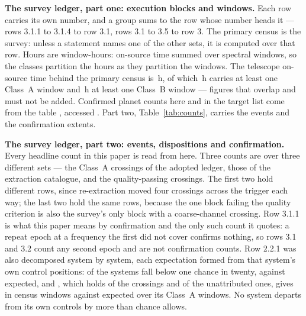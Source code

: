 \begin{table}
\centering
\scriptsize
\caption{\textbf{The survey ledger, part one: execution blocks and windows.}
Each row carries its own number, and a group sums to the row whose number
heads it --- rows 3.1.1 to 3.1.4 to row 3.1, rows 3.1 to 3.5 to row 3. The
primary census is the survey: unless a statement names one of the other sets,
it is computed over that row. Hours are window-hours: on-source time summed
over spectral windows, so the classes partition the hours as they partition
the windows. The telescope on-source time behind the primary census is
\StTelHours\,h, of which \StTelHoursFine\,h carries at least one Class~A
window and \StTelHoursCoarse\,h at least one Class~B window --- figures that
overlap and must not be added. Confirmed planet counts here and in the
target list come from the \SfHostCatalogue{} \SfHostTable{} table
\citep{NEA2013}, accessed \SfHostDate. Part two, Table~\ref{tab:counts},
carries the events and the confirmation extents.}
\label{tab:blockledger}

\end{table}

\begin{table}
\centering
\scriptsize
\caption{\textbf{The survey ledger, part two: events, dispositions and
confirmation.} Every headline count in this paper is read from here. Three
counts are \MtCrossA{} over three different sets --- the Class~A crossings of
the adopted ledger, those of the extraction catalogue, and the
quality-passing crossings. The first two hold different rows, since re-extraction moved four
crossings across the trigger each way; the last two hold the same rows,
because the one block failing the quality criterion is also the survey's only
block with a coarse-channel crossing. Row 3.1.1 is what this
paper means by confirmation and the only such count it quotes: a repeat epoch
at a frequency the first did not cover confirms nothing, so rows 3.1 and 3.2
count any second epoch and are not confirmation counts. Row 2.2.1 was also
decomposed system by system, each expectation formed from that system's own
control positions: \MtNSysLowP{} of the \MtNSysChance{} systems fall below
one chance in twenty, against \MtNSysLowPExp{} expected, and \MtTopStar,
which holds \MtTopStarNCross{} of the \EvNCrossRaw{} crossings and
\MtTopStarNUnattr{} of the unattributed ones, gives \MtTopSysObs{} in census
windows against \MtTopSysExp{} expected over its \MtTopSysNWin{} Class~A
windows. No system
departs from its own controls by more than chance allows.}
\label{tab:counts}

\end{table}


